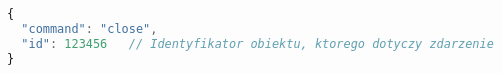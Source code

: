 \begin{lstlisting}[language=JavaScript,numbers=none]
{
  "command": "close",
  "id": 123456   // Identyfikator obiektu, ktorego dotyczy zdarzenie
}
\end{lstlisting} 